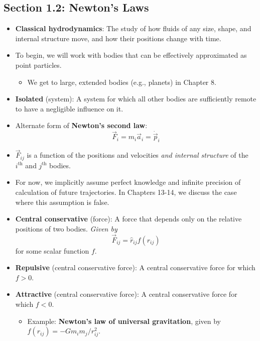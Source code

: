 \documentclass[../notes.tex]{subfiles}
\begin{document}
\subsection*{Section 1.2: Newton's Laws}
\begin{itemize}
    \item \textbf{Classical hydrodynamics}: The study of how fluids of any size, shape, and internal structure move, and how their positions change with time.
    \item To begin, we will work with bodies that can be effectively approximated as point particles.
    \begin{itemize}
        \item We get to large, extended bodies (e.g., planets) in Chapter 8.
    \end{itemize}
    \item \textbf{Isolated} (system): A system for which all other bodies are sufficiently remote to have a negligible influence on it.
    \item Alternate form of \textbf{Newton's second law}:
    \begin{equation*}
        \vec{F}_i = m_i\vec{a}_i = \dot{\vec{p}}_i
    \end{equation*}
    \item $\vec{F}_{ij}$ is a function of the positions and velocities \emph{and internal structure} of the $i^\text{th}$ and $j^\text{th}$ bodies.
    \item For now, we implicitly assume perfect knowledge and infinite precision of calculation of future trajectories. In Chapters 13-14, we discuss the case where this assumption is false.
    \item \textbf{Central conservative} (force): A force that depends only on the relative positions of two bodies. \emph{Given by}
    \begin{equation*}
        \vec{F}_{ij} = \hat{r}_{ij}f(r_{ij})
    \end{equation*}
    for some scalar function $f$.
    \item \textbf{Repulsive} (central conservative force): A central conservative force for which $f>0$.
    \item \textbf{Attractive} (central conservative force): A central conservative force for which $f<0$.
    \begin{itemize}
        \item Example: \textbf{Newton's law of universal gravitation}, given by $f(r_{ij})=-Gm_im_j/r_{ij}^2$.
    \end{itemize}

\end{itemize}
\end{document}
